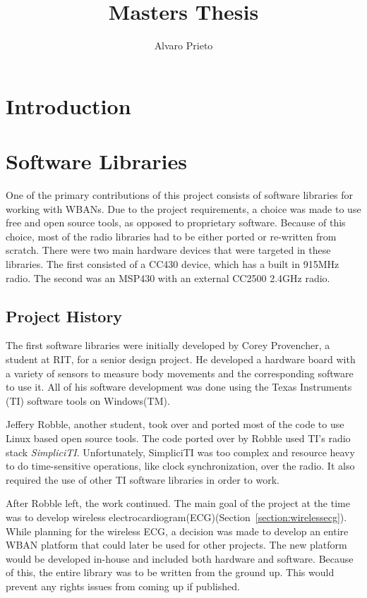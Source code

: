 \documentclass{article}
\begin{document}
\title{Masters Thesis}
\author{Alvaro Prieto}
\maketitle

\pagebreak

\tableofcontents

\pagebreak

\section{Introduction}



\section{Software Libraries}
One of the primary contributions of this project consists of software libraries for working with WBANs. Due to the project requirements, a choice was made to use free and open source tools, as opposed to proprietary software. Because of this choice, most of the radio libraries had to be either ported or re-written from scratch. There were two main hardware devices that were targeted in these libraries. The first consisted of a CC430 device, which has a built in 915MHz radio. The second was an MSP430 with an external CC2500 2.4GHz radio.

\subsection{Project History}
The first software libraries were initially developed by Corey Provencher, a student at RIT, for a senior design project. He developed a hardware board with a variety of sensors to measure body movements and the corresponding software to use it. All of his software development was done using the Texas Instruments (TI) software tools on Windows(TM).

Jeffery Robble, another student, took over and ported most of the code to use Linux based open source tools. The code ported over by Robble used TI's radio stack \emph{SimpliciTI}. Unfortunately, SimpliciTI was too complex and resource heavy to do time-sensitive operations, like clock synchronization, over the radio. It also required the use of other TI software libraries in order to work.

After Robble left, the work continued. The main goal of the project at the time was to develop wireless electrocardiogram(ECG)(Section~\ref{section:wirelessecg}). While planning for the wireless ECG, a decision was made to develop an entire WBAN platform that could later be used for other projects. The new platform would be developed in-house and included both hardware and software. Because of this, the entire library was to be written from the ground up. This would prevent any rights issues from coming up if published.
\end{document}
